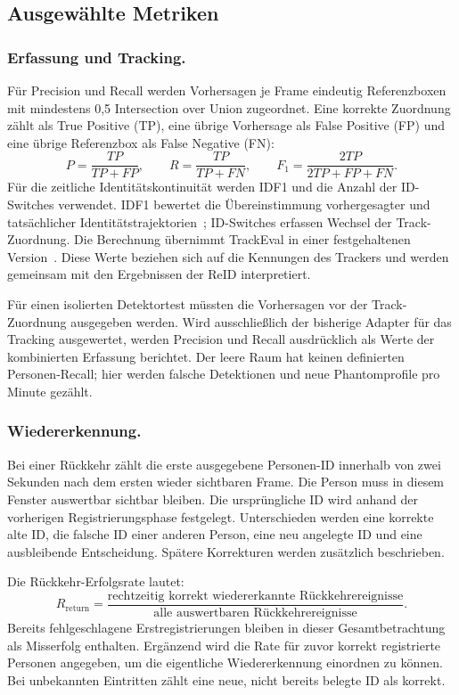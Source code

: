 \documentclass[runningheads]{llncs}
\begin{document}
\subsection{Ausgewählte Metriken}

\subsubsection{Erfassung und Tracking.}
Für Precision und Recall werden Vorhersagen je Frame eindeutig Referenzboxen mit mindestens 0,5 Intersection over Union zugeordnet. Eine korrekte Zuordnung zählt als True Positive (TP), eine übrige Vorhersage als False Positive (FP) und eine übrige Referenzbox als False Negative (FN):
\begin{equation}
P=\frac{TP}{TP+FP},\qquad
R=\frac{TP}{TP+FN},\qquad
F_1=\frac{2TP}{2TP+FP+FN}.
\label{eq:detection-metrics}
\end{equation}
Für die zeitliche Identitätskontinuität werden IDF1 und die Anzahl der ID-Switches verwendet. IDF1 bewertet die Übereinstimmung vorhergesagter und tatsächlicher Identitätstrajektorien~\cite{ristani2016identity}; ID-Switches erfassen Wechsel der Track-Zuordnung. Die Berechnung übernimmt TrackEval in einer festgehaltenen Version~\cite{trackeval}. Diese Werte beziehen sich auf die Kennungen des Trackers und werden gemeinsam mit den Ergebnissen der ReID interpretiert.

Für einen isolierten Detektortest müssten die Vorhersagen vor der Track-Zuordnung ausgegeben werden. Wird ausschlie{\ss}lich der bisherige Adapter für das Tracking ausgewertet, werden Precision und Recall ausdrücklich als Werte der kombinierten Erfassung berichtet. Der leere Raum hat keinen definierten Personen-Recall; hier werden falsche Detektionen und neue Phantomprofile pro Minute gezählt.

\subsubsection{Wiedererkennung.}
Bei einer Rückkehr zählt die erste ausgegebene Personen-ID innerhalb von zwei Sekunden nach dem ersten wieder sichtbaren Frame. Die Person muss in diesem Fenster auswertbar sichtbar bleiben. Die ursprüngliche ID wird anhand der vorherigen Registrierungsphase festgelegt. Unterschieden werden eine korrekte alte ID, die falsche ID einer anderen Person, eine neu angelegte ID und eine ausbleibende Entscheidung. Spätere Korrekturen werden zusätzlich beschrieben.

Die Rückkehr-Erfolgsrate lautet:
\begin{equation}
R_{\mathrm{return}}=
\frac{\text{rechtzeitig korrekt wiedererkannte Rückkehrereignisse}}
{\text{alle auswertbaren Rückkehrereignisse}}.
\label{eq:reentry}
\end{equation}
Bereits fehlgeschlagene Erstregistrierungen bleiben in dieser Gesamtbetrachtung als Misserfolg enthalten. Ergänzend wird die Rate für zuvor korrekt registrierte Personen angegeben, um die eigentliche Wiedererkennung einordnen zu können. Bei unbekannten Eintritten zählt eine neue, nicht bereits belegte ID als korrekt.
\end{document}
